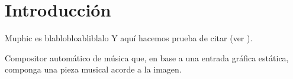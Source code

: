 \section{Introducción}


	Muphic es blablobloabliblalo
	Y aquí hacemos prueba de citar (ver \cite{portutesis}).
	
	Compositor automático de música que, en base a una entrada gráfica estática, componga una pieza musical acorde a la imagen.



